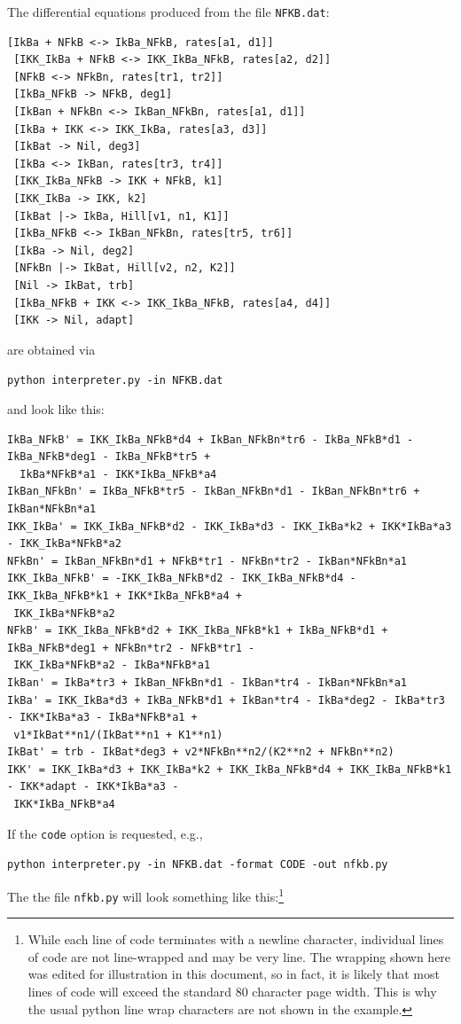 The differential equations produced from the file {\tt NFKB.dat}:
\begin{changemargin}{1.5in}{1in}
\begin{scriptsize}
\begin{Verbatim}[frame=single,xrightmargin=\leftmargin]
 [IkBa + NFkB <-> IkBa_NFkB, rates[a1, d1]]
 [IKK_IkBa + NFkB <-> IKK_IkBa_NFkB, rates[a2, d2]]
 [NFkB <-> NFkBn, rates[tr1, tr2]]
 [IkBa_NFkB -> NFkB, deg1]
 [IkBan + NFkBn <-> IkBan_NFkBn, rates[a1, d1]] 
 [IkBa + IKK <-> IKK_IkBa, rates[a3, d3]]
 [IkBat -> Nil, deg3]
 [IkBa <-> IkBan, rates[tr3, tr4]]
 [IKK_IkBa_NFkB -> IKK + NFkB, k1] 
 [IKK_IkBa -> IKK, k2]
 [IkBat |-> IkBa, Hill[v1, n1, K1]]
 [IkBa_NFkB <-> IkBan_NFkBn, rates[tr5, tr6]]
 [IkBa -> Nil, deg2]
 [NFkBn |-> IkBat, Hill[v2, n2, K2]] 
 [Nil -> IkBat, trb]
 [IkBa_NFkB + IKK <-> IKK_IkBa_NFkB, rates[a4, d4]] 
 [IKK -> Nil, adapt]
\end{Verbatim}
\end{scriptsize}
\end{changemargin}
are obtained via
\begin{center}
{\tt python interpreter.py -in NFKB.dat}
\end{center}
and look like this:
\begin{changemargin}{0.2in}{1in}
\begin{scriptsize}
\begin{Verbatim}[frame=single,xrightmargin=\leftmargin]
IkBa_NFkB' = IKK_IkBa_NFkB*d4 + IkBan_NFkBn*tr6 - IkBa_NFkB*d1 - IkBa_NFkB*deg1 - IkBa_NFkB*tr5 +
  IkBa*NFkB*a1 - IKK*IkBa_NFkB*a4
IkBan_NFkBn' = IkBa_NFkB*tr5 - IkBan_NFkBn*d1 - IkBan_NFkBn*tr6 + IkBan*NFkBn*a1
IKK_IkBa' = IKK_IkBa_NFkB*d2 - IKK_IkBa*d3 - IKK_IkBa*k2 + IKK*IkBa*a3 - IKK_IkBa*NFkB*a2
NFkBn' = IkBan_NFkBn*d1 + NFkB*tr1 - NFkBn*tr2 - IkBan*NFkBn*a1
IKK_IkBa_NFkB' = -IKK_IkBa_NFkB*d2 - IKK_IkBa_NFkB*d4 - IKK_IkBa_NFkB*k1 + IKK*IkBa_NFkB*a4 + 
 IKK_IkBa*NFkB*a2
NFkB' = IKK_IkBa_NFkB*d2 + IKK_IkBa_NFkB*k1 + IkBa_NFkB*d1 + IkBa_NFkB*deg1 + NFkBn*tr2 - NFkB*tr1 -
 IKK_IkBa*NFkB*a2 - IkBa*NFkB*a1
IkBan' = IkBa*tr3 + IkBan_NFkBn*d1 - IkBan*tr4 - IkBan*NFkBn*a1
IkBa' = IKK_IkBa*d3 + IkBa_NFkB*d1 + IkBan*tr4 - IkBa*deg2 - IkBa*tr3 - IKK*IkBa*a3 - IkBa*NFkB*a1 +
 v1*IkBat**n1/(IkBat**n1 + K1**n1)
IkBat' = trb - IkBat*deg3 + v2*NFkBn**n2/(K2**n2 + NFkBn**n2)
IKK' = IKK_IkBa*d3 + IKK_IkBa*k2 + IKK_IkBa_NFkB*d4 + IKK_IkBa_NFkB*k1 - IKK*adapt - IKK*IkBa*a3 -
 IKK*IkBa_NFkB*a4
\end{Verbatim}
\end{scriptsize}
\end{changemargin}
If the {\tt code} option is requested, e.g., 
\begin{center}
{\tt python interpreter.py -in NFKB.dat -format CODE -out nfkb.py}
\end{center}
The the file {\tt nfkb.py} will look something like this:\footnote{While each line of code terminates with a newline character, individual lines of code are not line-wrapped and may be very line. The wrapping shown here was edited for illustration in this document, so in fact, it is likely that most lines of code will exceed the standard 80 character page width. This is why the usual python line wrap characters are not shown in the example.}

